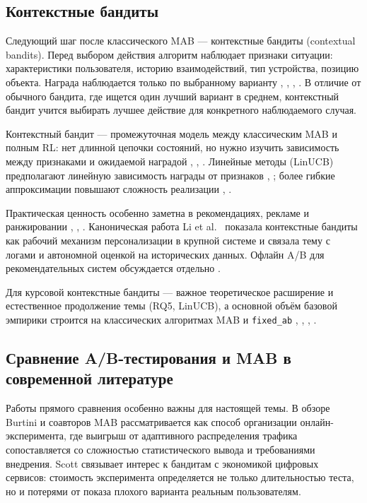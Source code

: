 \subsection{Контекстные бандиты}\label{ux43aux43eux43dux442ux435ux43aux441ux442ux43dux44bux435-ux431ux430ux43dux434ux438ux442ux44b}

Следующий шаг после классического MAB --- контекстные бандиты (contextual bandits). Перед выбором действия алгоритм наблюдает признаки ситуации: характеристики пользователя, историю взаимодействий, тип устройства, позицию объекта. Награда наблюдается только по выбранному варианту \cite{ref6}, \cite{ref15}, \cite{ref16}, \cite{ref17}. В отличие от обычного бандита, где ищется один лучший вариант в среднем, контекстный бандит учится выбирать лучшее действие для конкретного наблюдаемого случая.

Контекстный бандит --- промежуточная модель между классическим MAB и полным RL: нет длинной цепочки состояний, но нужно изучить зависимость между признаками и ожидаемой наградой \cite{ref15}, \cite{ref16}, \cite{ref17}. Линейные методы (LinUCB) предполагают линейную зависимость награды от признаков \cite{ref6}, \cite{ref15}; более гибкие аппроксимации повышают сложность реализации \cite{ref16}, \cite{ref17}.

Практическая ценность особенно заметна в рекомендациях, рекламе и ранжировании \cite{ref6}, \cite{ref31}, \cite{ref37}. Каноническая работа Li et al.~\cite{ref6} показала контекстные бандиты как рабочий механизм персонализации в крупной системе и связала тему с логами и автономной оценкой на исторических данных. Офлайн A/B для рекомендательных систем обсуждается отдельно \cite{ref37}.

Для курсовой контекстные бандиты --- важное теоретическое расширение и естественное продолжение темы (RQ5, LinUCB), а основной объём базовой эмпирики строится на классических алгоритмах MAB и \texttt{fixed\_ab} \cite{ref13}, \cite{ref14}, \cite{ref16}, \cite{ref17}.

\subsection{Сравнение A/B-тестирования и MAB в современной литературе}\label{ux441ux440ux430ux432ux43dux435ux43dux438ux435-ab-ux442ux435ux441ux442ux438ux440ux43eux432ux430ux43dux438ux44f-ux438-mab-ux432-ux441ux43eux432ux440ux435ux43cux435ux43dux43dux43eux439-ux43bux438ux442ux435ux440ux430ux442ux443ux440ux435}

Работы прямого сравнения особенно важны для настоящей темы. В обзоре Burtini и соавторов \cite{ref13} MAB рассматривается как способ организации онлайн-эксперимента, где выигрыш от адаптивного распределения трафика сопоставляется со сложностью статистического вывода и требованиями внедрения. Scott \cite{ref12} связывает интерес к бандитам с экономикой цифровых сервисов: стоимость эксперимента определяется не только длительностью теста, но и потерями от показа плохого варианта реальным пользователям.


